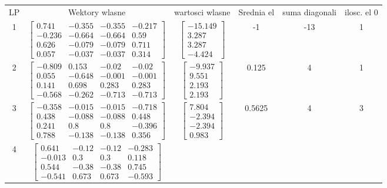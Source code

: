 \documentclass[a4paper,12pt]{article}
\begin{document}
      \vspace*{\fill}\newpage
\bgroup {} \vspace{0.2in} \begin{tabular}{c c c c c c}
LP &Wektory wlasne & wartosci wlasne & Srednia el & suma diagonali & ilosc. el 0\\
1
&
$\begin{bmatrix} 0.741 & -0.355 & -0.355 & -0.217 \\ -0.236 & -0.664 & -0.664 & 0.59 \\ 0.626 & -0.079 & -0.079 & 0.711 \\ 0.057 & -0.037 & -0.037 & 0.314 \end{bmatrix}$
&
$\begin{bmatrix} -15.149 \\ 3.287 \\ 3.287 \\ -4.424 \end{bmatrix}$
&
-1
&
-13
&
1
\\
2
&
$\begin{bmatrix} -0.809 & 0.153 & -0.02 & -0.02 \\ 0.055 & -0.648 & -0.001 & -0.001 \\ 0.141 & 0.698 & 0.283 & 0.283 \\ -0.568 & -0.262 & -0.713 & -0.713 \end{bmatrix}$
&
$\begin{bmatrix} -9.937 \\ 9.551 \\ 2.193 \\ 2.193 \end{bmatrix}$
&
0.125
&
4
&
1
\\
3
&
$\begin{bmatrix} -0.358 & -0.015 & -0.015 & -0.718 \\ 0.438 & -0.088 & -0.088 & 0.448 \\ 0.241 & 0.8 & 0.8 & -0.396 \\ 0.788 & -0.138 & -0.138 & 0.356 \end{bmatrix}$
&
$\begin{bmatrix} 7.804 \\ -2.394 \\ -2.394 \\ 0.983 \end{bmatrix}$
&
0.5625
&
4
&
3
\\
4
&
$\begin{bmatrix} 0.641 & -0.12 & -0.12 & -0.283 \\ -0.013 & 0.3 & 0.3 & 0.118 \\ 0.544 & -0.38 & -0.38 & 0.745 \\ -0.541 & 0.673 & 0.673 & -0.593 \end{bmatrix}$

\end{tabular}
\end{document}
